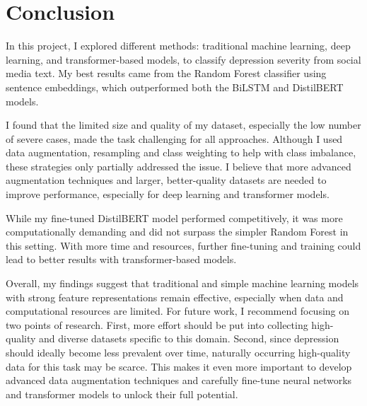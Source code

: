\section{Conclusion}

In this project, I explored different methods: traditional machine learning, deep learning, and transformer-based models, to classify depression severity from social media text. My best results came from the Random Forest classifier using sentence embeddings, which outperformed both the BiLSTM and DistilBERT models.

I found that the limited size and quality of my dataset, especially the low number of severe cases, made the task challenging for all approaches. Although I used data augmentation, resampling and class weighting to help with class imbalance, these strategies only partially addressed the issue. I believe that more advanced augmentation techniques and larger, better-quality datasets are needed to improve performance, especially for deep learning and transformer models.

While my fine-tuned DistilBERT model performed competitively, it was more computationally demanding and did not surpass the simpler Random Forest in this setting. With more time and resources, further fine-tuning and training could lead to better results with transformer-based models.

Overall, my findings suggest that traditional and simple machine learning models with strong feature representations remain effective, especially when data and computational resources are limited. For future work, I recommend focusing on two points of research. First, more effort should be put into collecting high-quality and diverse datasets specific to this domain. Second, since depression should ideally become less prevalent over time, naturally occurring high-quality data for this task may be scarce. This makes it even more important to develop advanced data augmentation techniques and carefully fine-tune neural networks and transformer models to unlock their full potential.